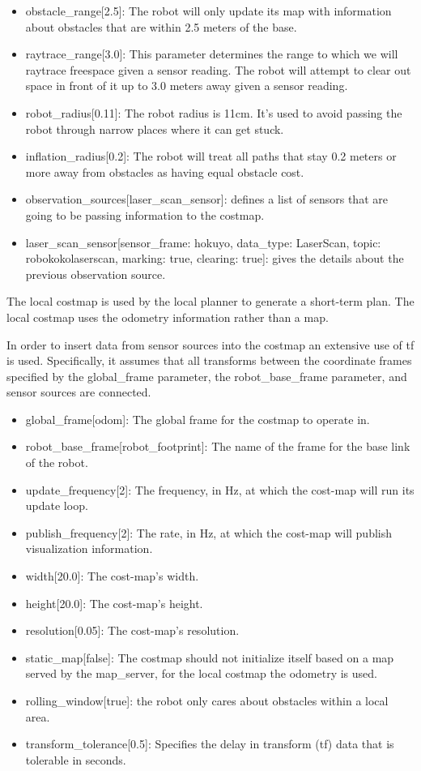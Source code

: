 \documentclass[10pt,journal,compsoc]{IEEEtran}
\begin{document}
\begin{itemize}
\item obstacle\_range[2.5]: The robot will only update its map with information about obstacles that are within 2.5 meters of the base.
\item raytrace\_range[3.0]: This parameter determines the range to which we will raytrace freespace given a sensor reading. The robot will attempt to clear out space in front of it up to 3.0 meters away given a sensor reading.
\item robot\_radius[0.11]: The robot radius is 11cm. It's used to avoid passing the robot through narrow places where it can get stuck.
\item inflation\_radius[0.2]: The robot will treat all paths that stay 0.2 meters or more away from obstacles as having equal obstacle cost.
\item observation\_sources[laser\_scan\_sensor]: defines a list of sensors that are going to be passing information to the costmap. 
\item laser\_scan\_sensor[sensor\_frame: hokuyo, data\_type: LaserScan, topic: \/robokoko\/laser\/scan, marking: true, clearing: true]: gives the details about the previous observation source.
\end{itemize}

The local costmap is used by the local planner to generate a short-term plan. The local costmap uses the odometry information rather than a map.

In order to insert data from sensor sources into the costmap an extensive use of tf is used. Specifically, it assumes that all transforms between the coordinate frames specified by the global\_frame parameter, the robot\_base\_frame parameter, and sensor sources are connected. 

\begin{itemize}
\item global\_frame[odom]: The global frame for the costmap to operate in.
\item robot\_base\_frame[robot\_footprint]: The name of the frame for the base link of the robot.
\item update\_frequency[2]: The frequency, in Hz, at which the cost-map will run its update loop. 
\item publish\_frequency[2]: The rate, in Hz, at which the cost-map will publish visualization information.
\item width[20.0]: The cost-map's width.
\item height[20.0]: The cost-map's height.
\item resolution[0.05]: The cost-map's resolution.
\item static\_map[false]: The costmap should not initialize itself based on a map served by the map\_server, for the local costmap the odometry is used.
\item rolling\_window[true]:  the robot only cares about obstacles within a local area.
\item transform\_tolerance[0.5]: Specifies the delay in transform (tf) data that is tolerable in seconds.
\end{itemize}
\end{document}
